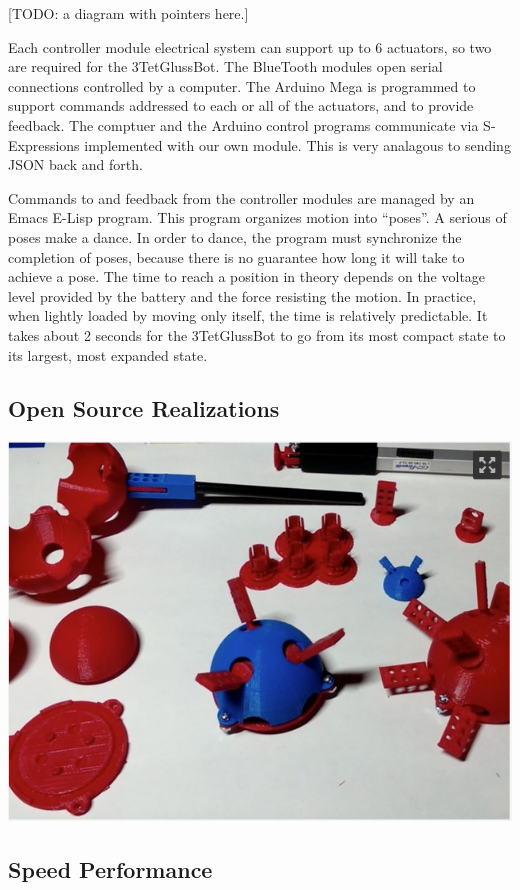 \documentclass[12pt]{article}
\begin{document}
[TODO: a diagram with pointers here.]

Each controller module electrical system can support up to 6 actuators, so two are required for the 3TetGlussBot.
The BlueTooth modules open serial connections controlled by a computer.
The Arduino Mega is programmed to support commands addressed to each or all of the actuators, and
to provide feedback. The comptuer and the Arduino control programs communicate via S-Expressions
implemented with our own module. This is very analagous to sending JSON back and forth.

Commands to and feedback from the controller modules are managed by an Emacs E-Lisp program.
This program organizes motion into ``poses''. A serious of poses make a dance.
In order to dance, the program must synchronize the completion of poses, because there is no
guarantee how long it will take to achieve a pose. The time to reach a position in theory
depends on the voltage level provided by the battery and the force resisting the motion.
In practice, when lightly loaded by moving only itself, the time is relatively predictable. It takes
about 2 seconds for the 3TetGlussBot to go from its most compact state to its largest, most expanded state.

\subsection{Open Source Realizations}

\includegraphics[scale=0.5]{TurretJointPieces.png}

\subsection{Speed Performance}
\end{document}
